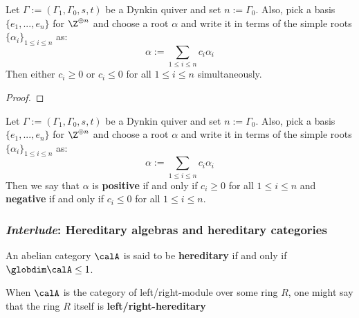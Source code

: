             \begin{lemma} \label{lemma: roots_are_exclusively_either_negative_or_positive}
                Let $\Gamma := (\Gamma_1, \Gamma_0, s, t)$ be a Dynkin quiver and set $n := \Gamma_0$. Also, pick a basis $\{e_1, ..., e_n\}$ for $\Z^{\oplus n}$ and choose a root $\alpha$ and write it in terms of the simple roots $\{\alpha_i\}_{1 \leq i \leq n}$ as:
                    $$\alpha := \sum_{1 \leq i \leq n} c_i \alpha_i$$
                Then either $c_i \geq 0$ or $c_i \leq 0$ for all $1 \leq i \leq n$ simultaneously.
            \end{lemma}
                \begin{proof}
                    
                \end{proof}
            \begin{definition} \label{def: negative_and_positive_roots}
                Let $\Gamma := (\Gamma_1, \Gamma_0, s, t)$ be a Dynkin quiver and set $n := \Gamma_0$. Also, pick a basis $\{e_1, ..., e_n\}$ for $\Z^{\oplus n}$ and choose a root $\alpha$ and write it in terms of the simple roots $\{\alpha_i\}_{1 \leq i \leq n}$ as:
                    $$\alpha := \sum_{1 \leq i \leq n} c_i \alpha_i$$
                Then we say that $\alpha$ is \textbf{positive} if and only if $c_i \geq 0$ for all $1 \leq i \leq n$ and \textbf{negative} if and only if $c_i \leq 0$ for all $1 \leq i \leq n$.
            \end{definition}
            \begin{example}
                
            \end{example}
            
        \subsubsection{\textit{Interlude}: Hereditary algebras and hereditary categories}
            \begin{definition} \label{def: hereditary_abelian_categories}
                An abelian category $\calA$ is said to be \textbf{hereditary} if and only if $\globdim \calA \leq 1$.
            \end{definition}
            \begin{convention} \label{conv: left/right_hereditary_rings}
                When $\calA$ is the category of left/right-module over some ring $R$, one might say that the ring $R$ itself is \textbf{left/right-hereditary}
            \end{convention}
            
